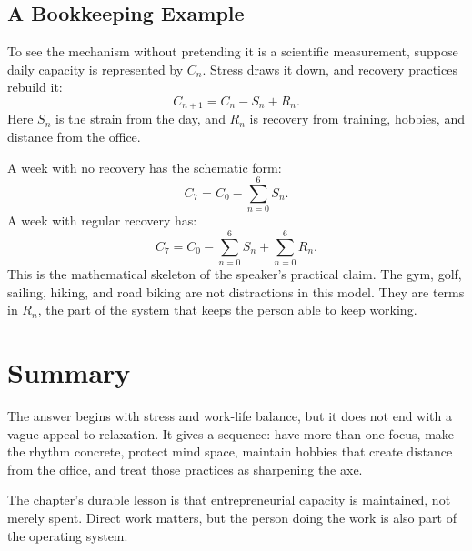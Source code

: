 \subsection{A Bookkeeping Example}

To see the mechanism without pretending it is a scientific measurement, suppose daily capacity is represented by \(C_n\). Stress draws it down, and recovery practices rebuild it:
\begin{equation}
C_{n+1}=C_n-S_n+R_n.
\end{equation}
Here \(S_n\) is the strain from the day, and \(R_n\) is recovery from training, hobbies, and distance from the office.

A week with no recovery has the schematic form:
\begin{equation}
C_7=C_0-\sum_{n=0}^{6}S_n.
\end{equation}
A week with regular recovery has:
\begin{equation}
C_7=C_0-\sum_{n=0}^{6}S_n+\sum_{n=0}^{6}R_n.
\end{equation}
This is the mathematical skeleton of the speaker's practical claim. The gym, golf, sailing, hiking, and road biking are not distractions in this model. They are terms in \(R_n\), the part of the system that keeps the person able to keep working.

\section{Summary}

The answer begins with stress and work-life balance, but it does not end with a vague appeal to relaxation. It gives a sequence: have more than one focus, make the rhythm concrete, protect mind space, maintain hobbies that create distance from the office, and treat those practices as sharpening the axe.

The chapter's durable lesson is that entrepreneurial capacity is maintained, not merely spent. Direct work matters, but the person doing the work is also part of the operating system.
